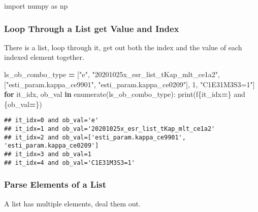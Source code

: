 \documentclass[
]{book}
\newenvironment{Shaded}{\begin{snugshade}}{\end{snugshade}}
\newcommand{\BuiltInTok}[1]{#1}
\newcommand{\ControlFlowTok}[1]{\textcolor[rgb]{0.13,0.29,0.53}{\textbf{#1}}}
\newcommand{\DecValTok}[1]{\textcolor[rgb]{0.00,0.00,0.81}{#1}}
\newcommand{\ImportTok}[1]{#1}
\newcommand{\KeywordTok}[1]{\textcolor[rgb]{0.13,0.29,0.53}{\textbf{#1}}}
\newcommand{\NormalTok}[1]{#1}
\newcommand{\OperatorTok}[1]{\textcolor[rgb]{0.81,0.36,0.00}{\textbf{#1}}}
\newcommand{\SpecialCharTok}[1]{\textcolor[rgb]{0.00,0.00,0.00}{#1}}
\newcommand{\SpecialStringTok}[1]{\textcolor[rgb]{0.31,0.60,0.02}{#1}}
\newcommand{\StringTok}[1]{\textcolor[rgb]{0.31,0.60,0.02}{#1}}
\begin{document}
\begin{Shaded}
\begin{Highlighting}[]
\ImportTok{import}\NormalTok{ numpy }\ImportTok{as}\NormalTok{ np}
\end{Highlighting}
\end{Shaded}

\hypertarget{loop-through-a-list-get-value-and-index}{%
\subsubsection{Loop Through a List get Value and Index}\label{loop-through-a-list-get-value-and-index}}

There is a list, loop through it, get out both the index and the value of each indexed element together.

\begin{Shaded}
\begin{Highlighting}[]
\NormalTok{ls\_ob\_combo\_type }\OperatorTok{=}\NormalTok{ [}\StringTok{"e"}\NormalTok{, }\StringTok{"20201025x\_esr\_list\_tKap\_mlt\_ce1a2"}\NormalTok{, [}\StringTok{"esti\_param.kappa\_ce9901"}\NormalTok{, }\StringTok{"esti\_param.kappa\_ce0209"}\NormalTok{], }\DecValTok{1}\NormalTok{, }\StringTok{"C1E31M3S3=1"}\NormalTok{]}
\ControlFlowTok{for}\NormalTok{ it\_idx, ob\_val }\KeywordTok{in} \BuiltInTok{enumerate}\NormalTok{(ls\_ob\_combo\_type):}
    \BuiltInTok{print}\NormalTok{(}\SpecialStringTok{f\textquotesingle{}}\SpecialCharTok{\{}\NormalTok{it\_idx}\OperatorTok{=}\SpecialCharTok{\}}\SpecialStringTok{ and }\SpecialCharTok{\{}\NormalTok{ob\_val}\OperatorTok{=}\SpecialCharTok{\}}\SpecialStringTok{\textquotesingle{}}\NormalTok{)}
\end{Highlighting}
\end{Shaded}

\begin{verbatim}
## it_idx=0 and ob_val='e'
## it_idx=1 and ob_val='20201025x_esr_list_tKap_mlt_ce1a2'
## it_idx=2 and ob_val=['esti_param.kappa_ce9901', 'esti_param.kappa_ce0209']
## it_idx=3 and ob_val=1
## it_idx=4 and ob_val='C1E31M3S3=1'
\end{verbatim}

\hypertarget{parse-elements-of-a-list}{%
\subsubsection{Parse Elements of a List}\label{parse-elements-of-a-list}}

A list has multiple elements, deal them out.
\end{document}
